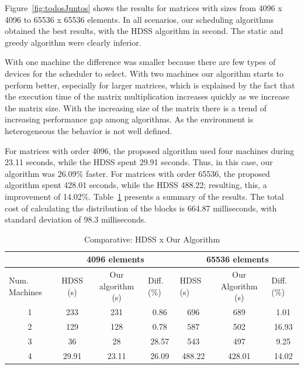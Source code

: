 \documentclass[journal]{IEEEtran}
\begin{document}
Figure~\ref{fig:todosJuntos} shows the results for matrices with sizes from
4096 x 4096 to 65536 x 65536 elements. In all scenarios, our scheduling algorithms
obtained the best results, with the HDSS algorithm in second. The static and
greedy algorithm were clearly inferior.

With one machine the difference was smaller because there are few types of
devices for the scheduler to select. With two machines our algorithm starts to
perform better, especially for larger matrices, which is explained by the fact
that the execution time of the matrix multiplication increases quickly as we
increase the matrix size. With the increasing size of the matrix there is a trend of increasing performance gap among algorithms. As the environment is heterogeneous the behavior is not well defined.

For matrices with order 4096, the proposed algorithm used four machines during 23.11 seconds, while the HDSS spent 29.91 seconds. Thus, in this case, our algorithm was 26.09\% faster. For matrices with order 65536, the proposed algorithm spent 428.01 seconds, while the HDSS 488.22; resulting, this, a improvement of 14.02\%.  Table~\ref{table: comparativo} presents a summary of the results. The total cost of calculating the distribution of the blocks is 664.87 milliseconds, with standard deviation of 98.3 milliseconds. 

\begin{table}[htb]
\centering
\caption{Comparative: HDSS x Our Algorithm}

\begin{tabular}{c|c|c|c|c|c|c|}
\cline{2-7}
\multicolumn{1}{l|}{}                 & \multicolumn{3}{c|}{4096 elements}                              & \multicolumn{3}{c|}{65536 elements}                                                  \\ \hline
\multicolumn{1}{|l|}{Num. Machines} & HDSS (s) & Our algorithm (s) & \multicolumn{1}{l|}{Diff. (\%)} & \multicolumn{1}{l|}{HDSS (s)} & Our Algorithm (s) & \multicolumn{1}{l|}{Diff. (\%)} \\ \hline
\multicolumn{1}{|c|}{1 }       & 233     & 231              &   0.86                        
			 & 696                          &   689             &    1.01                        \\ \hline
\multicolumn{1}{|c|}{2 }      & 129     & 128              &    0.78                         
				& 587                         & 502             & 16.93                     \\ \hline
\multicolumn{1}{|c|}{3 }      & 36     & 28              & 28.57                            
			&          543                &    497           &      9.25                          \\ \hline
\multicolumn{1}{|c|}{4 }      & 29.91     & 23.11            & 26.09                       
			    & 488.22                          & 428.01              &     14.02            \\ \hline
\end{tabular}
\label{table: comparativo}
\end{table}
\end{document}
